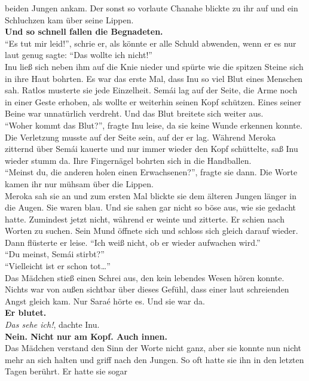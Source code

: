 beiden Jungen ankam. Der sonst so vorlaute Chanahe blickte zu ihr auf und ein Schluchzen kam über 
seine Lippen.\\
\textbf{Und so schnell fallen die Begnadeten.}\\
``Es tut mir leid!'', schrie er, als könnte er alle Schuld abwenden, wenn er es nur laut genug 
sagte: ``Das wollte ich nicht!''\\
Inu ließ sich neben ihm auf die Knie nieder und spürte wie die spitzen Steine sich in ihre Haut 
bohrten. Es war das erste Mal, dass Inu so viel Blut eines Menschen sah. Ratlos musterte sie jede 
Einzelheit. Semái lag auf der Seite, die Arme noch in einer Geste erhoben, als wollte er weiterhin 
seinen Kopf schützen. Eines seiner Beine war unnatürlich verdreht. Und das Blut breitete sich 
weiter aus.\\
``Woher kommt das Blut?'', fragte Inu leise, da sie keine Wunde erkennen konnte. Die Verletzung 
musste auf der Seite sein, auf der er lag. Während Meroka zitternd über Semái kauerte und nur immer 
wieder den Kopf schüttelte, saß Inu wieder stumm da. Ihre Fingernägel bohrten sich in die 
Handballen. \\
``Meinst du, die anderen holen einen Erwachsenen?'', fragte sie dann. Die Worte kamen ihr nur 
mühsam über die Lippen.\\
Meroka sah sie an und zum ersten Mal blickte sie dem älteren Jungen länger in die Augen. Sie waren 
blau. Und sie sahen gar nicht so böse aus, wie sie gedacht hatte. Zumindest jetzt nicht, während er 
weinte und zitterte. Er schien nach Worten zu suchen. Sein Mund öffnete sich und schloss sich 
gleich darauf wieder. Dann flüsterte er leise. ``Ich weiß nicht, ob er wieder aufwachen wird.''\\
``Du meinst, Semái stirbt?''\\
``Vielleicht ist er schon tot…''\\
Das Mädchen stieß einen Schrei aus, den kein lebendes Wesen hören konnte. Nichts war von außen 
sichtbar über dieses Gefühl, dass einer laut schreienden Angst gleich kam. Nur Saraé hörte es. Und 
sie war da. \\
\textbf{Er blutet.}\\
\textit{Das sehe ich!}, dachte Inu.\\
\textbf{Nein. Nicht nur am Kopf. Auch innen.}\\
Das Mädchen verstand den Sinn der Worte nicht ganz, aber sie konnte nun nicht mehr an sich halten 
und griff nach den Jungen. So oft hatte sie ihn in den letzten Tagen berührt. Er hatte sie sogar 
